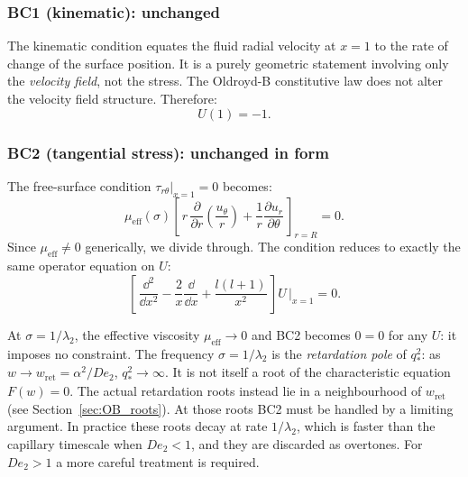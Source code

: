 \subsubsection{BC1 (kinematic): unchanged}

The kinematic condition equates the fluid radial velocity at $x=1$ to the
rate of change of the surface position. It is a purely geometric statement
involving only the \emph{velocity field}, not the stress. The Oldroyd-B
constitutive law does not alter the velocity field structure. Therefore:
\begin{equation}
  U(1) = -1. \tag{BC1, unchanged}
\end{equation}

\subsubsection{BC2 (tangential stress): unchanged in form}

The free-surface condition $\tau_{r\theta}|_{x=1} = 0$ becomes:
\[
  \mu_{\mathrm{eff}}(\sigma)\!\left[\,r\,\frac{\partial}{\partial r}
  \!\left(\frac{u_\theta}{r}\right)
  + \frac{1}{r}\frac{\partial u_r}{\partial\theta}\,\right]_{r=R} = 0.
\]
Since $\mu_{\mathrm{eff}} \neq 0$ generically, we divide through. The
condition reduces to exactly the same operator equation on $U$:
\begin{equation}
  \left[\,\frac{\dd^2}{\dd x^2}
  - \frac{2}{x}\frac{\dd}{\dd x}
  + \frac{l(l+1)}{x^2}\,\right]U\,\bigg|_{x=1} = 0. \tag{BC2, unchanged}
\end{equation}

\begin{notebox}[The zero of $\mu_{\mathrm{eff}}$ at $\sigma = 1/\lambda_2$]
At $\sigma = 1/\lambda_2$, the effective viscosity $\mu_{\mathrm{eff}} \to 0$
and BC2 becomes $0 = 0$ for any $U$: it imposes no constraint.
The frequency $\sigma = 1/\lambda_2$ is the \emph{retardation pole} of
$q_*^2$: as $w \to w_{\mathrm{ret}} = \alpha^2/De_2$, $q_*^2 \to \infty$.
It is not itself a root of the characteristic equation $F(w) = 0$. The actual retardation roots instead lie in a neighbourhood of $w_{\mathrm{ret}}$ (see Section~\ref{sec:OB_roots}).
At those roots BC2 must be handled by a limiting argument. In practice these
roots decay at rate $1/\lambda_2$, which is faster than the capillary
timescale when $De_2 < 1$, and they are discarded as overtones. For
$De_2 > 1$ a more careful treatment is required.
\end{notebox}

